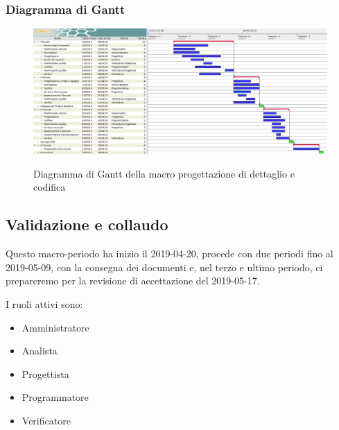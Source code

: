         \begin{landscape}
			\subsubsection{Diagramma di Gantt}
			\begin{figure}[H]
					\centering
					\includegraphics[scale=0.42]{img/Progettazione_di_dettaglio_e_codifica.png}\\
					\caption{Diagramma di Gantt della macro progettazione di dettaglio e codifica}
			\end{figure}
		\end{landscape}
		\newpage

        \subsection{Validazione e collaudo}\label{PianificazineValidazione}
		Questo macro-periodo ha inizio il 2019-04-20, procede con due periodi fino al 2019-05-09, con la consegna dei documenti e, nel terzo e ultimo periodo,
		ci prepareremo per la revisione di accettazione del 2019-05-17.

        I ruoli attivi sono:
        \begin{itemize}
            \item Amministratore
            \item Analista
            \item Progettista
            \item Programmatore
            \item Verificatore
		\end{itemize}

